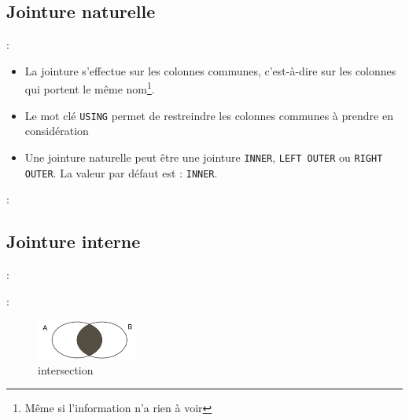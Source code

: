\documentclass[10pt]{beamer}
\begin{document}
\subsection{Jointure naturelle}
\begin{frame}{\secname : \subsecname}
    \begin{itemize}
        \item   La jointure s'effectue sur les colonnes communes, c'est-à-dire sur les colonnes qui portent le même nom\footnote{Même si l'information n'a rien à voir}.
        \item Le mot clé \lstinline[language=plsql]!USING! permet de restreindre les colonnes communes à prendre en considération
        \item Une jointure naturelle peut être une jointure \lstinline[language=plsql]!INNER!, \lstinline[language=plsql]!LEFT OUTER! ou \lstinline[language=plsql]!RIGHT OUTER!. La valeur par défaut est : \lstinline[language=plsql]!INNER!.
    \end{itemize}
    
\end{frame}

\begin{frame}{\secname : \subsecname}
    
\end{frame}


\subsection{Jointure interne}

\begin{frame}{\secname : \subsecname}
    
\end{frame}

\begin{frame}{\secname : \subsecname}
    
    \begin{figure}
        \begin{center}
            \includegraphics[width=0.3\textwidth]{../assets/img/intersection.pdf}
            \caption{intersection}
        \end{center}
    \end{figure}
\end{frame}
\end{document}
